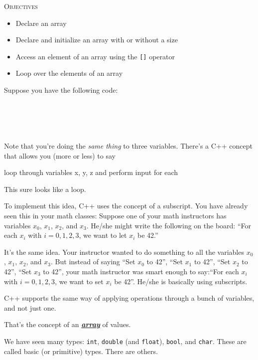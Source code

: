 \newpage{}

\textsc{Objectives}

\begin{itemize}
\item
  Declare an array
\item
  Declare and initialize an array with or without a size
\item
  Access an element of an array using the \texttt{[]} operator
\item
  Loop over the elements of an array
\end{itemize}

\newpage{}

Suppose you have the following code:

\\
\\
\\
\\
Note that you're doing the \emph{same thing} to three variables. There's a C++ concept that allows you (more or less) to say
\begin{center}
loop through variables x, y, z and perform input for each
\end{center}
This sure looks like a loop.

To implement this idea, C++ uses the concept of a subscript. You have already seen this in your math classes: Suppose one of your math instructors has variables $x_{0}$, $x_{1}$, $x_{2}$, and $x_{3}$. He/she might write the following on the board: ``For each $x_{i}$ with $i = 0, 1, 2, 3$, we want to let $x_{i}$ be 42.''

It's the same idea. Your instructor wanted to do something to all the variables $x_{0}$, $x_{1}$, $x_{2}$, and $x_{3}$. But instead of saying ``Set $x_{0}$ to 42'', ``Set $x_{1}$ to 42'', ``Set $x_{2}$ to 42'', ``Set $x_{3}$ to 42'', your math instructor was smart enough to say:``For each $x_{i}$ with $i = 0, 1, 2, 3$, we want to set $x_{i}$ be 42''. He/she is basically using subscripts.

C++ supports the same way of applying operations through a bunch of variables, and not just one.

That's the concept of an \underline{\emph{\textbf{array}}} of values.

\newpage{}

We have seen many types: \texttt{int}, \texttt{double} (and \texttt{float}), \texttt{bool}, and \texttt{char}. These are called basic (or primitive) types. There are others.

